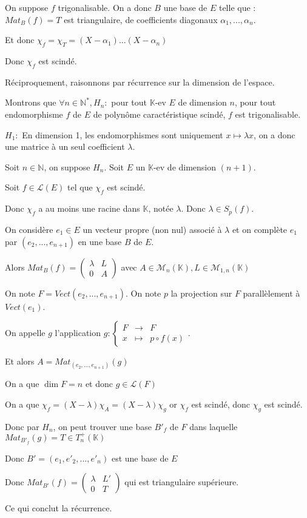 \documentclass[a4paper,12pt]{book}
\newcommand{\Pre}[1]{\begin{tcolorbox}[sharp corners, colback=white,colframe=green!60!green!30!black!75, title=Preuve]#1\end{tcolorbox}}
\def\N{\mathbb{N}}
\def\K{\mathbb{K}}
\begin{document}
\Pre{On suppose $f$ trigonalisable. On a donc $B$ une base de $E$ telle que : $Mat_B(f)= T$ est triangulaire, de coefficients diagonaux $\alpha_1,...,\alpha_n$. \par Et donc $\chi_f=\chi_T=(X-\alpha_1)...(X-\alpha_n)$ \par Donc $\chi_f$ est scindé.
\par Réciproquement, raisonnons par récurrence sur la dimension de l'espace. \par Montrons que $\forall n\in\N^*, H_n :$ pour tout $\K$-ev $E$ de dimension $n$, pour tout endomorphisme $f$ de $E$ de polynôme caractéristique scindé, $f$ est trigonalisable.
\par $H_1 :$ En dimension 1, les endomorphismes sont uniquement $x\mapsto \lambda x$, on a donc une matrice à un seul coefficient $\lambda$.
\par Soit $n\in\N$, on suppose $H_n$. Soit $E$ un $\K$-ev de dimension $(n+1)$. \par Soit $f\in\mathcal{L}(E)$ tel que $\chi_f$ est scindé. \par Donc $\chi_f$ a au moins une racine dans $\K$, notée $\lambda$. Donc $\lambda\in S_p(f)$. \par On considère $e_1\in E$ un vecteur propre (non nul) associé à $\lambda$ et on complète $e_1$ par $(e_2,..., e_{n+1})$ en une base $B$ de $E$. \par Alors $Mat_B(f) =\begin{pmatrix} \lambda & L \\ 0 & A \end{pmatrix}$ avec $A\in\mathcal{M}_n(\K), L\in\mathcal{M}_{1,n}(\K)$
\par On note $F=Vect(e_2,...,e_{n+1})$. On note $p$ la projection sur $F$ parallèlement à $Vect(e_1)$.
\par On appelle $g$ l'application $g:\left\{\begin{array}{rcl} F & \to & F \\ x & \mapsto & p\circ f(x) \end{array}\right.$.
\par Et alors $A=Mat_{(e_2,...,e_{n+1})}(g)$ \par On a que $\dim F =n$ et donc $g\in\mathcal{L}(F)$
\par On a que $\chi_f = (X-\lambda)\chi_A = (X-\lambda)\chi_g$ or $\chi_f$ est scindé, donc $\chi_g$ est scindé.
\par Donc par $H_n$, on peut trouver une base $B'_f$ de $F$ dans laquelle $Mat_{B'_f}(g)=T\in T_n^+(\K)$
\par Donc $B'=(e_1,e'_2,..., e'_n)$ est une base de $E$
\par Donc $Mat_{B'}(f)=\begin{pmatrix} \lambda & L' \\ 0 & T\end{pmatrix}$ qui est triangulaire supérieure.
\par Ce qui conclut la récurrence.}
\end{document}
